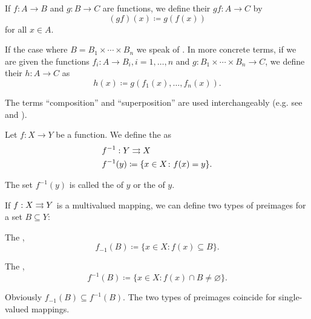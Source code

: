 \begin{definition}\label{def:function_composition}
  If \( f: A \to B \) and \( g: B \to C \) are functions, we define their  \( gf: A \to C \) by
  \begin{equation*}
    (gf)(x) \coloneqq g(f(x))
  \end{equation*}
  for all \( x \in A \).

  If the case where \( B = B_1 \times \cdots \times B_n \) we speak of . In more concrete terms, if we are given the functions \( f_i: A \to B_i, i = 1, \ldots, n \) and \( g: B_1 \times \cdots \times B_n \to C \), we define their  \( h: A \to C \) as
  \begin{equation*}
    h(x) \coloneqq g(f_1(x), \ldots, f_n(x)).
  \end{equation*}

  The terms \enquote{composition} and \enquote{superposition} are used interchangeably (e.g. see \cite[44]{Enderton1977} and \cite[]{Фихтенгольц1968/1}).
\end{definition}

\begin{definition}\label{def:function_preimage}
  Let \( f: X \to Y \) be a function. We define the  as
  \begin{align*}
    &f^{-1} : Y \rightrightarrows X \\
    &f^{-1}(y) \coloneqq \{ x \in X \colon f(x) = y \}.
  \end{align*}

  The set \( f^{-1}(y) \) is called the  of \( y \) or the  of \( y \).

  If \( f : X \rightrightarrows Y \) is a multivalued mapping, we can define two types of preimages for a set \( B \subseteq Y \):
  \begin{defenum}
    \item The ,
    \begin{equation*}
      f_{-1}(B) \coloneqq \{ x \in X \colon f(x) \subseteq B \}.
    \end{equation*}

    \item The ,
    \begin{equation*}
      f^{-1}(B) \coloneqq \{ x \in X \colon f(x) \cap B \neq \varnothing \}.
    \end{equation*}
  \end{defenum}

  Obviously \( f_{-1}(B) \subseteq f^{-1}(B) \). The two types of preimages coincide for single-valued mappings.
\end{definition}

